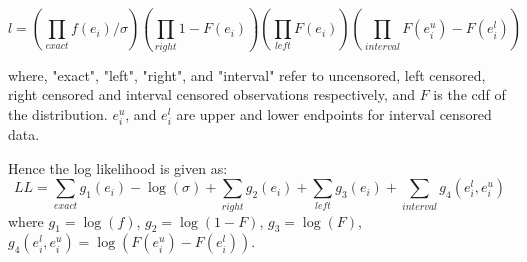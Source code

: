 \documentclass[12pt,a4paper]{report}
\begin{document}
\begin{equation}
l = \left (\prod_{exact} f(e_i) / \sigma\right) \left (\prod_{right} 1-F(e_i)\right) \left (\prod_{left} F(e_i)\right) \left (\prod_{interval} F(e_i^u) - F(e_i^l)\right )
\end{equation}

%

where, "exact", "left", "right", and "interval" refer to uncensored, left censored, right censored and interval censored observations respectively, and $F$ is the cdf of the distribution. $e_i^u$, and $e_i^l$ are upper and lower endpoints for interval censored data.


Hence the log likelihood is given as:
\begin{equation} \label{lik0}
LL = \sum_{exact} g_1(e_i) - \log(\sigma) + \sum_{right} g_2(e_i) + \sum_{left} g_3(e_i) + \sum_{interval} g_4(e_i^l, e_i^u)
\end{equation}
where $g_1 = \log(f)$, $g_2 = \log(1-F)$, $g_3 = \log(F)$, $g_4(e_i^l, e_i^u) = \log(F(e_i^u) - F(e_i^l))$.

%
\end{document}
